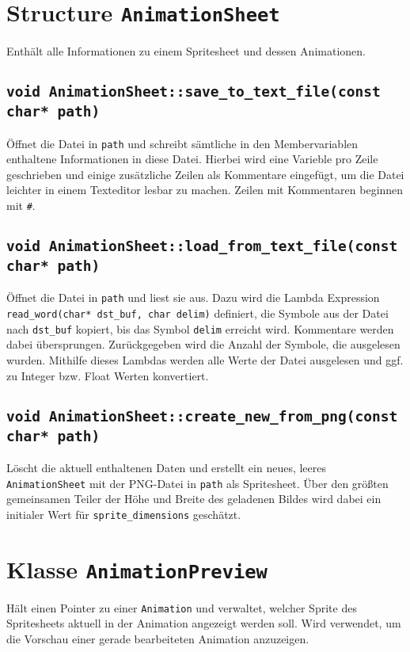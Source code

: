 \chapter{Structure \lstinline{AnimationSheet}}
Enthält alle Informationen zu einem Spritesheet und dessen Animationen. 

\section{\lstinline{void AnimationSheet::save_to_text_file(const char* path)}}
Öffnet die Datei in \lstinline{path} und schreibt sämtliche in den Membervariablen enthaltene Informationen in diese Datei. Hierbei wird eine Varieble pro Zeile geschrieben und einige zusätzliche Zeilen als Kommentare eingefügt, um die Datei leichter in einem Texteditor lesbar zu machen. Zeilen mit Kommentaren beginnen mit \lstinline{#}. 

\section{\lstinline{void AnimationSheet::load_from_text_file(const char* path)}}
Öffnet die Datei in \lstinline{path} und liest sie aus. Dazu wird die Lambda Expression \lstinline{read_word(char* dst_buf, char delim)} definiert, die Symbole aus der Datei nach \lstinline{dst_buf} kopiert, bis das Symbol \lstinline{delim} erreicht wird. Kommentare werden dabei übersprungen. Zurückgegeben wird die Anzahl der Symbole, die ausgelesen wurden. Mithilfe dieses Lambdas werden alle Werte der Datei ausgelesen und ggf. zu Integer bzw. Float Werten konvertiert.

\section{\lstinline{void AnimationSheet::create_new_from_png(const char* path)}}
Löscht die aktuell enthaltenen Daten und erstellt ein neues, leeres \lstinline{AnimationSheet} mit der PNG-Datei in \lstinline{path} als Spritesheet. Über den größten gemeinsamen Teiler der Höhe und Breite des geladenen Bildes wird dabei ein initialer Wert für \lstinline{sprite_dimensions} geschätzt.



\chapter{Klasse \lstinline{AnimationPreview}}
Hält einen Pointer zu einer \lstinline{Animation} und verwaltet, welcher Sprite des Spritesheets aktuell in der Animation angezeigt werden soll. Wird verwendet, um die Vorschau einer gerade bearbeiteten Animation anzuzeigen. 

